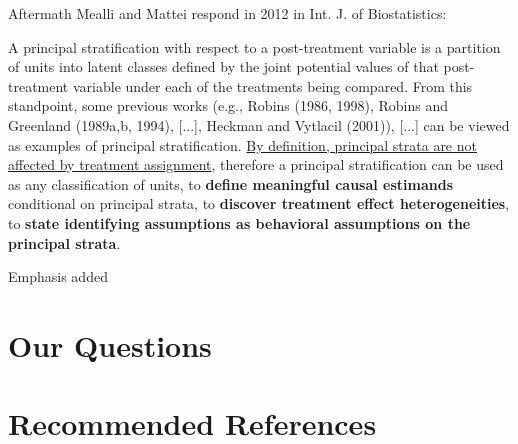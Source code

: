 \documentclass[10pt]{beamer}
\begin{document}
\begin{frame}{Aftermath}
Mealli and Mattei respond in 2012 in Int. J. of Biostatistics: 

\footnotesize 
     A principal stratification with respect to a post-treatment variable is a partition 
     of units into latent classes defined by the joint potential values of that post-treatment variable under each of the treatments being compared. From this standpoint, some previous works (e.g., Robins (1986, 1998), Robins and Greenland
(1989a,b, 1994), [...], Heckman and Vytlacil (2001)), [...] can be viewed as 
examples of principal stratification. \ul{By definition,
principal strata are not affected by treatment assignment}, therefore a principal stratification 
can be used as any classification of units, to \textbf{define meaningful causal 
estimands} conditional on principal strata, to \textbf{discover treatment effect heterogeneities},
to \textbf{state identifying assumptions as behavioral assumptions on the principal strata}.

\tiny * Emphasis added
\normalsize
\end{frame}

\section*{Our Questions}

\section{Recommended References} 
\end{document}
